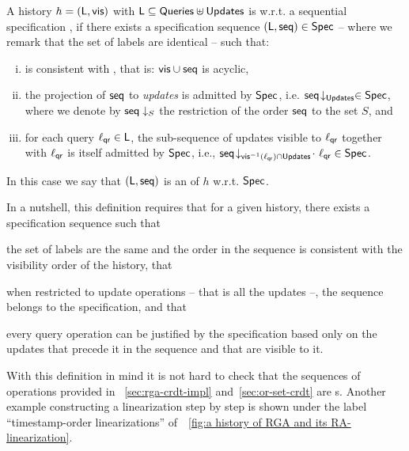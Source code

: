 \begin{definition}
  \label{definition:ralinearizability1} A history $h =
  (\mathsf{L},\mathsf{vis})$ with $\mathsf{L}\subseteq \mathsf{Queries}\uplus\mathsf{Updates}$ is \crdtlinearizable{} w.r.t. a
   sequential specification
  \Spec{}, if there exists a specification sequence
  $(\mathsf{L}, \mathsf{seq}) \in \mathsf{Spec}{}$ -- where we remark that the set of labels
  are identical -- such that: %
  \begin{enumerate}[(i)]
  \item \aseqord{} is consistent with  \avisord{}, that is: $\mathsf{vis}
    \cup \mathsf{seq}$ is acyclic,
  \item the projection of $\mathsf{seq}$ to \emph{updates} is
    admitted by $\mathsf{Spec}$, i.e.
    $\mathsf{seq}\!\downarrow_{\mathsf{Updates}} \in \mathsf{Spec}$, where we denote by
    $\mathsf{seq}\downarrow_{S}$ the restriction of the order $\mathsf{seq}$ to
    the set $S$, and
  \item\label{it:query} for each query $\ell_{\mathsf{qr}}\in \mathsf{L}$, the sub-sequence of updates visible to $\ell_{\mathsf{qr}}$ together with $\ell_{\mathsf{qr}}$ is itself admitted by $\mathsf{Spec}$, i.e., $\mathsf{seq}\!\downarrow_{\mathsf{vis}^{-1}(\ell_{\mathsf{qr}})\cap \mathsf{Updates}}\!\cdot\
    \ell_{\mathsf{qr}} \in \mathsf{Spec}$.
\end{enumerate}
In this case we say that $(\mathsf{L}, \mathsf{seq})$ is an \emph{\crdtlinearization{}} of $h$ w.r.t. $\mathsf{Spec}{}$.
\end{definition}

In a nutshell, this definition requires that for a given
history, there exists a specification sequence such
that
\begin{inparaenum}[(i)]
\item the set of labels are the same and the order in the sequence is
  consistent with the visibility order of the history, that
\item when restricted to update operations -- that is all the updates --, the sequence belongs to
  the specification, and that
\item every query operation can be justified by the specification based only
  on the updates that precede it in the sequence and that are visible
  to it.
\end{inparaenum}
%
With this definition in mind it is not hard to check that the
sequences of operations provided in
\sectionautorefname~\ref{sec:rga-crdt-impl} and~\ref{sec:or-set-crdt}
are \crdtlinearization{}s. 
%
Another example constructing a linearization step by step is shown
under the label ``timestamp-order linearizations''
of~\figureautorefname~\ref{fig:a history of RGA and its
  RA-linearization}.

